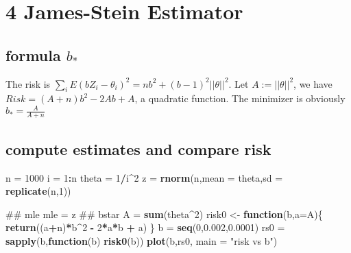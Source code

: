 \documentclass[]{article}
\newenvironment{Shaded}{\begin{snugshade}}{\end{snugshade}}
\newcommand{\KeywordTok}[1]{\textcolor[rgb]{0.13,0.29,0.53}{\textbf{#1}}}
\newcommand{\DataTypeTok}[1]{\textcolor[rgb]{0.13,0.29,0.53}{#1}}
\newcommand{\DecValTok}[1]{\textcolor[rgb]{0.00,0.00,0.81}{#1}}
\newcommand{\FloatTok}[1]{\textcolor[rgb]{0.00,0.00,0.81}{#1}}
\newcommand{\StringTok}[1]{\textcolor[rgb]{0.31,0.60,0.02}{#1}}
\newcommand{\ControlFlowTok}[1]{\textcolor[rgb]{0.13,0.29,0.53}{\textbf{#1}}}
\newcommand{\OperatorTok}[1]{\textcolor[rgb]{0.81,0.36,0.00}{\textbf{#1}}}
\newcommand{\NormalTok}[1]{#1}
\begin{document}
\section{4 James-Stein Estimator}\label{james-stein-estimator}

\subsection{\texorpdfstring{formula
\(b_*\)}{formula b\_*}}\label{formula-b_}

The risk is
\(\sum_{i} E(bZ_i-\theta_i)^2 = nb^2 + (b-1)^2 ||\theta||^2\). Let
\(A := ||\theta||^2\), we have \(Risk = (A+n)b^2 - 2Ab + A\), a
quadratic function. The minimizer is obviously \(b_* = \frac{A}{A+n}\)

\subsection{compute estimates and compare
risk}\label{compute-estimates-and-compare-risk}

\begin{Shaded}
\begin{Highlighting}[]
\NormalTok{n =}\StringTok{ }\DecValTok{1000}
\NormalTok{i =}\StringTok{ }\DecValTok{1}\OperatorTok{:}\NormalTok{n}
\NormalTok{theta =}\StringTok{ }\DecValTok{1}\OperatorTok{/}\NormalTok{i}\OperatorTok{^}\DecValTok{2}
\NormalTok{z =}\StringTok{ }\KeywordTok{rnorm}\NormalTok{(n,}\DataTypeTok{mean =}\NormalTok{ theta,}\DataTypeTok{sd =} \KeywordTok{replicate}\NormalTok{(n,}\DecValTok{1}\NormalTok{))}

\NormalTok{## mle}
\NormalTok{mle =}\StringTok{ }\NormalTok{z}
\NormalTok{##  bstar}
\NormalTok{A =}\StringTok{ }\KeywordTok{sum}\NormalTok{(theta}\OperatorTok{^}\DecValTok{2}\NormalTok{)}
\NormalTok{risk0 <-}\StringTok{ }\ControlFlowTok{function}\NormalTok{(b,}\DataTypeTok{a=}\NormalTok{A)\{}
  \KeywordTok{return}\NormalTok{((a}\OperatorTok{+}\NormalTok{n)}\OperatorTok{*}\NormalTok{b}\OperatorTok{^}\DecValTok{2} \OperatorTok{-}\StringTok{ }\DecValTok{2}\OperatorTok{*}\NormalTok{a}\OperatorTok{*}\NormalTok{b }\OperatorTok{+}\StringTok{ }\NormalTok{a)}
\NormalTok{\}}
\NormalTok{b =}\StringTok{ }\KeywordTok{seq}\NormalTok{(}\DecValTok{0}\NormalTok{,}\FloatTok{0.002}\NormalTok{,}\FloatTok{0.0001}\NormalTok{)}
\NormalTok{rs0 =}\StringTok{ }\KeywordTok{sapply}\NormalTok{(b,}\ControlFlowTok{function}\NormalTok{(b) }\KeywordTok{risk0}\NormalTok{(b))}
\KeywordTok{plot}\NormalTok{(b,rs0, }\DataTypeTok{main =} \StringTok{"risk vs b"}\NormalTok{)}
\end{Highlighting}
\end{Shaded}
\end{document}
